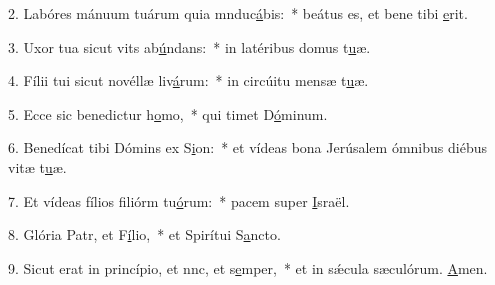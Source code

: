 2. Labóres mánuum tuárum quia mnduc\uline{á}bis:~* beátus es, et bene tibi \uline{e}rit.\par 
3. Uxor tua sicut vits ab\uline{ú}ndans:~* in latéribus domus t\uline{u}æ.\par 
4. Fílii tui sicut novéllæ liv\uline{á}rum:~* in circúitu mensæ t\uline{u}æ.\par 
5. Ecce sic benedictur h\uline{o}mo,~* qui timet D\uline{ó}minum.\par 
6. Benedícat tibi Dómins ex S\uline{i}on:~* et vídeas bona Jerúsalem ómnibus diébus vitæ t\uline{u}æ.\par 
7. Et vídeas fílios filiórm tu\uline{ó}rum:~* pacem super \uline{I}sraël.\par 
8. Glória Patr, et F\uline{í}lio,~* et Spirítui S\uline{a}ncto.\par 
9. Sicut erat in princípio, et nnc, et s\uline{e}mper,~* et in sǽcula sæculórum. \uline{A}men.\par 
